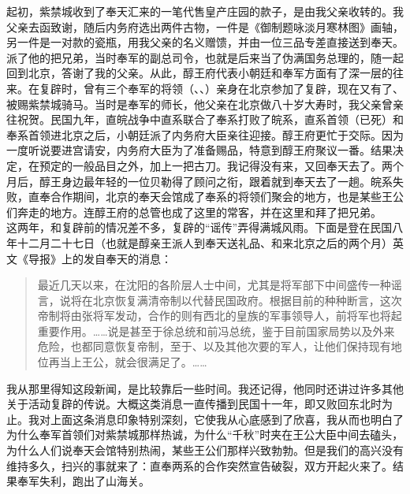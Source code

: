 起初，紫禁城收到了奉天汇来的一笔代售皇产庄园的款子，是由我父亲收转的。我父亲去函致谢，随后内务府选出两件古物，一件是《御制题咏淡月寒林图》画轴，另一件是一对款的瓷瓶，用我父亲的名义赠馈，并由一位三品专差直接送到奉天。派了他的把兄弟，当时奉军的副总司令，也就是后来当了伪满国务总理的，随一起回到北京，答谢了我的父亲。从此，醇王府代表小朝廷和奉军方面有了深一层的往来。在复辟时，曾有三个奉军的将领（、、）亲身在北京参加了复辟，现在又有了、被赐紫禁城骑马。当时是奉军的师长，他父亲在北京做八十岁大寿时，我父亲曾亲往祝贺。民国九年，直皖战争中直系联合了奉系打败了皖系，直系首领（已死）和奉系首领进北京之后，小朝廷派了内务府大臣亲往迎接。醇王府更忙于交际。因为一度听说要进宫请安，内务府大臣为了准备赐品，特意到醇王府聚议一番。结果决定，在预定的一般品目之外，加上一把古刀。我记得没有来，又回奉天去了。两个月后，醇王身边最年轻的一位贝勒得了顾问之衔，跟着就到奉天去了一趟。皖系失败，直奉合作期间，北京的奉天会馆成了奉系的将领们聚会的地方，也是某些王公们奔走的地方。连醇王府的总管也成了这里的常客，并在这里和拜了把兄弟。\\

这两年，和复辟前的情况差不多，复辟的“谣传”弄得满城风雨。下面是登在民国八年十二月二十七日（也就是醇亲王派人到奉天送礼品、和来北京之后的两个月）英文《导报》上的发自奉天的消息：\\

\begin{quote}
	最近几天以来，在沈阳的各阶层人士中间，尤其是将军部下中间盛传一种谣言，说将在北京恢复满清帝制以代替民国政府。根据目前的种种断言，这次帝制将由张将军发动，合作的则有西北的皇族的军事领导人，前将军也将起重要作用。……说是甚至于徐总统和前冯总统，鉴于目前国家局势以及外来危险，也都同意恢复帝制，至于、以及其他次要的军人，让他们保持现有地位再当上王公，就会很满足了。……\\
\end{quote}

我从那里得知这段新闻，是比较靠后一些时间。我还记得，他同时还讲过许多其他关于活动复辟的传说。大概这类消息一直传播到民国十一年，即又败回东北时为止。我对上面这条消息印象特别深刻，它使我从心底感到了欣喜，我从而也明白了为什么奉军首领们对紫禁城那样热诚，为什么“千秋”时夹在王公大臣中间去磕头，为什么人们说奉天会馆特别热闹，某些王公们那样兴致勃勃。但是我们的高兴没有维持多久，扫兴的事就来了：直奉两系的合作突然宣告破裂，双方开起火来了。结果奉军失利，跑出了山海关。\\

